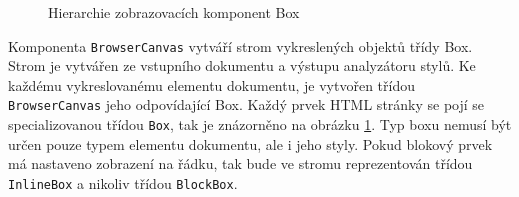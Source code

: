 \begin{figure}[H]
  \begin{center}
    \caption{Hierarchie zobrazovacích komponent Box}
    \label{Figure.BoxHierarchy}
  \end{center}
\end{figure}

Komponenta \texttt{BrowserCanvas} vytváří strom vykreslených objektů třídy Box. Strom je vytvářen ze vstupního dokumentu a výstupu analyzátoru stylů. Ke každému vykreslovanému elementu dokumentu, je vytvořen třídou \texttt{BrowserCanvas} jeho odpovídající Box. Každý prvek HTML stránky se pojí se specializovanou třídou \texttt{Box}, tak je znázorněno na obrázku \ref{Figure.BoxHierarchy}. Typ boxu nemusí být určen pouze typem elementu dokumentu, ale i jeho styly. Pokud blokový prvek má nastaveno zobrazení na řádku, tak bude ve stromu reprezentován třídou \texttt{InlineBox} a nikoliv třídou \texttt{BlockBox}. 

